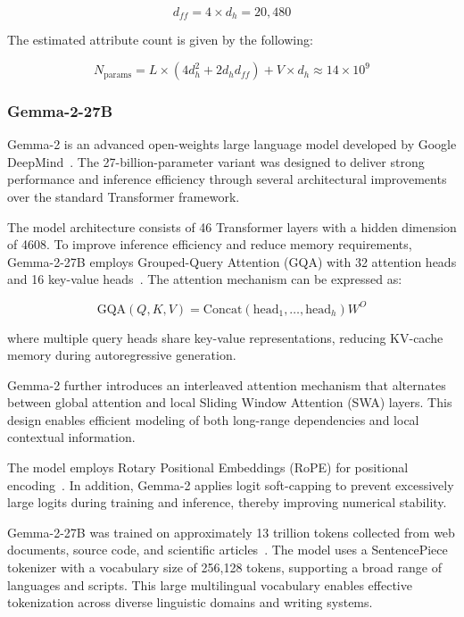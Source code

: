 \documentclass[10pt,letterpaper]{article}
\begin{document}
\begin{equation}
d_{ff} = 4 \times d_h = 20{,}480
\label{eq:phi_ffn}
\end{equation}

The estimated attribute count is given by the following:

\begin{equation}
N_{\text{params}} = L \times (4d_h^2 + 2d_h d_{ff}) + V \times d_h \approx 14 \times 10^9
\label{eq:phi_params}
\end{equation}

\subsubsection*{Gemma-2-27B}

Gemma-2 is an advanced open-weights large language model developed by Google DeepMind~\cite{b40}. The 27-billion-parameter variant was designed to deliver strong performance and inference efficiency through several architectural improvements over the standard Transformer framework.

The model architecture consists of 46 Transformer layers with a hidden dimension of 4608. To improve inference efficiency and reduce memory requirements, Gemma-2-27B employs Grouped-Query Attention (GQA) with 32 attention heads and 16 key-value heads~\cite{b40}. The attention mechanism can be expressed as:

\begin{equation}
\text{GQA}(Q,K,V)=\text{Concat}(\text{head}_1,\ldots,\text{head}_h)W^O
\label{eq:gemma_gqa}
\end{equation}

where multiple query heads share key-value representations, reducing KV-cache memory during autoregressive generation.

Gemma-2 further introduces an interleaved attention mechanism that alternates between global attention and local Sliding Window Attention (SWA) layers. This design enables efficient modeling of both long-range dependencies and local contextual information.

The model employs Rotary Positional Embeddings (RoPE) for positional encoding~\cite{b40}. In addition, Gemma-2 applies logit soft-capping to prevent excessively large logits during training and inference, thereby improving numerical stability.

Gemma-2-27B was trained on approximately 13 trillion tokens collected from web documents, source code, and scientific articles~\cite{b40}. The model uses a SentencePiece tokenizer with a vocabulary size of 256,128 tokens, supporting a broad range of languages and scripts. This large multilingual vocabulary enables effective tokenization across diverse linguistic domains and writing systems.
\end{document}

